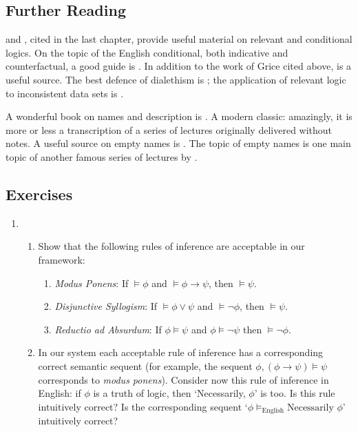 {\small
\subsection*{Further Reading}


\citet{bevpospa} and \citet{burphilo}, cited in the last chapter, provide useful material on relevant and conditional logics. On the topic of the English conditional, both indicative and counterfactual, a good guide is \citet{benphiguc}. In addition to the work of Grice cited above, \citet{sep-implicature} is a useful source. The best defence of dialethism is \citet{priinco}; the application of relevant logic to inconsistent data sets is \citet{belusefov}.  

A wonderful book on names and description is \citet{krinamne}. A modern classic: amazingly, it is more or less a transcription of a series of lectures originally delivered without notes. A useful source on empty names is \citet{capempna}. The topic of empty names is one main topic of another famous series of lectures by \citet{krirefex}.



\subsection*{Exercises}


\begin{enumerate}
	
	\item 	\begin{enumerate} \item Show that the following rules of inference are acceptable in our framework: \begin{enumerate}
		\item \emph{Modus Ponens}: If $\vDash \phi$ and $\vDash \phi \to \psi$, then $\vDash \psi$.
				\item \emph{Disjunctive Syllogism}: If $\vDash \phi \vee \psi$ and $\vDash \neg \phi$, then $\vDash \psi$.
				\item \emph{Reductio ad Absurdum}: If $\phi \vDash \psi$ and $\phi \vDash \neg \psi$ then $\vDash \neg \phi$. \end{enumerate}
	\item
		 In our system each acceptable rule of inference has a corresponding correct semantic sequent (for example, the sequent $\phi, (\phi \to \psi) \vDash \psi$ corresponds to  \emph{modus ponens}). Consider now this rule of inference in English: if $\phi$ is a truth of logic, then `Necessarily, $\phi$' is too.  Is this rule intuitively correct? Is the corresponding sequent `$\phi \vDash_{\text{English}} \text{Necessarily } \phi$' intuitively correct?
		\end{enumerate}


\end{enumerate}}
